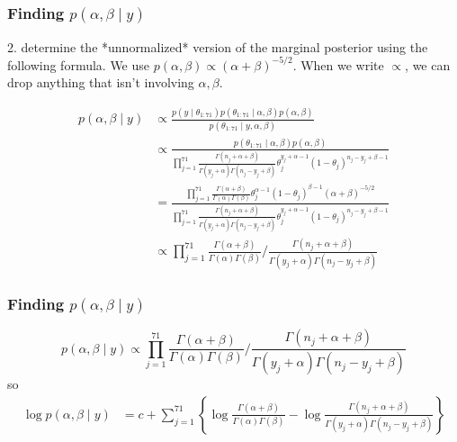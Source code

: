 \documentclass{beamer}
\begin{document}
\begin{frame}
\frametitle{Finding $p(\alpha,\beta \mid y)$ }

2. determine the *unnormalized* version of the marginal posterior using the following formula. We use $p(\alpha, \beta) \propto (\alpha + \beta)^{-5/2}$. When we write $\propto$, we can drop anything that isn't involving $\alpha, \beta$.

\begin{align*}
p(\alpha, \beta \mid y) &\propto \frac{p(y \mid \theta_{1:71})p(\theta_{1:71} \mid \alpha, \beta)p(\alpha, \beta) }{p(\theta_{1:71} \mid y, \alpha, \beta) } \tag{earlier slides} \\
&\propto \frac{p(\theta_{1:71} \mid \alpha, \beta)p(\alpha, \beta) }{ \prod_{j=1}^{71}\frac{\Gamma(n_j + \alpha + \beta )}{ \Gamma(y_j+\alpha)\Gamma(n_j - y_j + \beta) }\theta_j^{y_j+\alpha-1}(1-\theta_j)^{n_j - y_j + \beta-1} } \\
&= \frac{ \prod_{j=1}^{71} \frac{\Gamma(\alpha + \beta )}{ \Gamma(\alpha)\Gamma( \beta) } \theta_j^{\alpha-1}(1-\theta_j)^{\beta-1} (\alpha + \beta)^{-5/2} }{ \prod_{j=1}^{71}\frac{\Gamma(n_j + \alpha + \beta )}{ \Gamma(y_j+\alpha)\Gamma(n_j - y_j + \beta) }\theta_j^{y_j+\alpha-1}(1-\theta_j)^{n_j - y_j + \beta-1} } \\
&\propto \prod_{j=1}^{71} \frac{\Gamma(\alpha + \beta )}{ \Gamma(\alpha)\Gamma( \beta) } \bigg/ \frac{\Gamma(n_j + \alpha + \beta )}{ \Gamma(y_j+\alpha)\Gamma(n_j - y_j + \beta) } 
\end{align*}

\end{frame}

\begin{frame}
\frametitle{Finding $p(\alpha,\beta \mid y)$ }

\[
p(\alpha, \beta \mid y) \propto \prod_{j=1}^{71} \frac{\Gamma(\alpha + \beta )}{ \Gamma(\alpha)\Gamma( \beta) } \bigg/ \frac{\Gamma(n_j + \alpha + \beta )}{ \Gamma(y_j+\alpha)\Gamma(n_j - y_j + \beta) }
\]
so
\begin{align*}
\log p(\alpha, \beta \mid y) &= c +  \sum_{j=1}^{71} \left\{ \log  \frac{\Gamma(\alpha + \beta )}{ \Gamma(\alpha)\Gamma( \beta) } - \log \frac{\Gamma(n_j + \alpha + \beta )}{ \Gamma(y_j+\alpha)\Gamma(n_j - y_j + \beta) } \right\}\\
\end{align*}
\end{frame}
\end{document}
